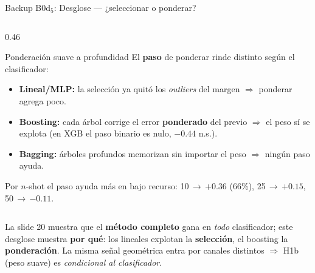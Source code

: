 \begin{frame}{Backup B0d$_5$: Desglose --- ¿seleccionar o ponderar?}
\begin{columns}[T]
\begin{column}{0.46\textwidth}
\begin{block}{\small Ponderación suave a profundidad}
\scriptsize
El \textbf{paso} de ponderar rinde distinto según el clasificador:
\begin{itemize}\setlength\itemsep{1pt}
  \item \textbf{Lineal/MLP:} la \alert{selección} ya quitó los \emph{outliers} del margen $\Rightarrow$ ponderar agrega poco.
  \item \textbf{Boosting:} cada árbol corrige el error \textbf{ponderado} del previo $\Rightarrow$ el peso \alert{sí} se explota (en XGB el paso binario es nulo, $-0{.}44$ n.s.).
  \item \textbf{Bagging:} árboles profundos memorizan sin importar el peso $\Rightarrow$ ningún paso ayuda.
\end{itemize}
\vspace{1pt}
{\tiny Por $n$-shot el paso ayuda más en bajo recurso: 10\,$\to$\,\alert{$+0{.}36$} (66\%), 25\,$\to$\,$+0{.}15$, 50\,$\to$\,$-0{.}11$.}
\end{block}
\end{column}

\end{columns}

\vspace{0.2em}
\begin{insight}
\scriptsize La slide 20 muestra que el \textbf{método completo} gana en \emph{todo} clasificador; este desglose muestra \textbf{por qué}: los lineales explotan la \textbf{selección}, el boosting la \textbf{ponderación}. La misma señal geométrica entra por canales distintos $\Rightarrow$ H1b (peso suave) es \emph{condicional al clasificador}.
\end{insight}
\end{frame}

